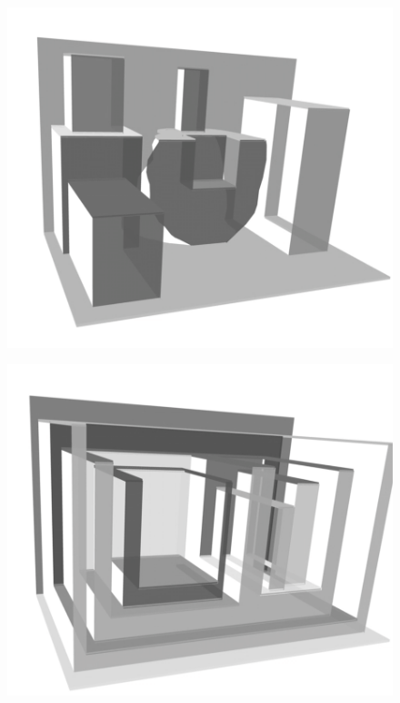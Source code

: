 \begin{figure}[htbp]
\centering
\includegraphics{figures/92_Appendix_Visual_Aids_Materials/still_card3.png}
\caption{}
\end{figure}

\begin{figure}[htbp]
\centering
\includegraphics{figures/92_Appendix_Visual_Aids_Materials/still_card4.png}
\caption{}
\end{figure}

